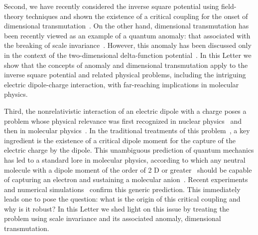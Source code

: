 \documentclass[a4paper,twocolumn,
showpacs,amssymb,aps,prl,superscriptaddress]{revtex4}%
\begin{document}
Second, we have recently considered the inverse square potential
using field-theory techniques and shown the existence of a
critical coupling for the onset of dimensional
transmutation~\cite{cam:00}. On the other hand, dimensional
transmutation has been recently viewed as an example of a quantum
anomaly: that associated with the breaking of scale
invariance~\cite{jac:91,hol:93}. However, this anomaly has been
discussed only in the context of the two-dimensional
delta-function potential~\cite{cab:98}.
 In this
Letter we show that the concepts of anomaly and dimensional
transmutation apply to the inverse square potential and related
physical problems, including the intriguing electric dipole-charge
interaction, with far-reaching implications in molecular physics.

Third, the nonrelativistic interaction of an electric dipole
with a charge poses a problem whose physical relevance was first
recognized in nuclear physics~\cite{fer:47,wig:49} and then in
molecular physics~\cite{lev:67,bro:67,cra:67}. In the traditional
treatments of this problem~\cite{tur:77}, a key ingredient is the
existence of a critical dipole moment for the capture of the
electric charge by the dipole. This unambiguous prediction of
quantum mechanics has led to a standard lore in molecular
physics, according to which any neutral molecule with a dipole
moment of the order of 2 D or greater~\cite{debye}
 should be capable of
capturing an electron and sustaining a molecular
anion~\cite{cra:71}. Recent experiments~\cite{mea:84,des:94} and
numerical simulations~\cite{des:94} confirm this generic
prediction. This immediately leads one to pose the question: what
is the origin of this critical coupling and why is it robust? In
this Letter we shed light on this issue by treating the problem
using scale invariance and its associated anomaly, dimensional
transmutation.
\end{document}
